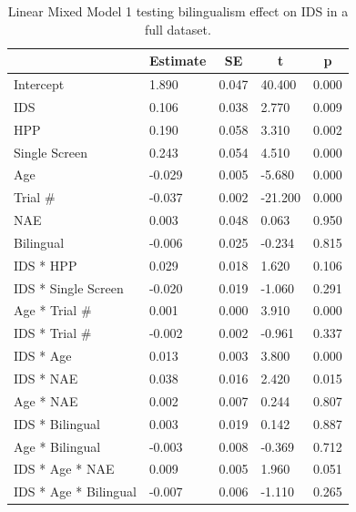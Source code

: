 \documentclass[,man,floatsintext]{apa6}
\begin{document}
\begin{table}[tbp]

\begin{center}
\begin{threeparttable}

\caption{\label{tab:unnamed-chunk-8}Linear Mixed Model 1 testing bilingualism effect on IDS in a full dataset.}

\begin{tabular}{lllll}
\toprule
 & \multicolumn{1}{c}{Estimate} & \multicolumn{1}{c}{SE} & \multicolumn{1}{c}{t} & \multicolumn{1}{c}{p}\\
\midrule
Intercept & 1.890 & 0.047 & 40.400 & 0.000\\
IDS & 0.106 & 0.038 & 2.770 & 0.009\\
HPP & 0.190 & 0.058 & 3.310 & 0.002\\
Single Screen & 0.243 & 0.054 & 4.510 & 0.000\\
Age & -0.029 & 0.005 & -5.680 & 0.000\\
Trial \# & -0.037 & 0.002 & -21.200 & 0.000\\
NAE & 0.003 & 0.048 & 0.063 & 0.950\\
Bilingual & -0.006 & 0.025 & -0.234 & 0.815\\
IDS * HPP & 0.029 & 0.018 & 1.620 & 0.106\\
IDS * Single Screen & -0.020 & 0.019 & -1.060 & 0.291\\
Age * Trial \# & 0.001 & 0.000 & 3.910 & 0.000\\
IDS * Trial \# & -0.002 & 0.002 & -0.961 & 0.337\\
IDS * Age & 0.013 & 0.003 & 3.800 & 0.000\\
IDS * NAE & 0.038 & 0.016 & 2.420 & 0.015\\
Age * NAE & 0.002 & 0.007 & 0.244 & 0.807\\
IDS * Bilingual & 0.003 & 0.019 & 0.142 & 0.887\\
Age * Bilingual & -0.003 & 0.008 & -0.369 & 0.712\\
IDS * Age * NAE & 0.009 & 0.005 & 1.960 & 0.051\\
IDS * Age * Bilingual & -0.007 & 0.006 & -1.110 & 0.265\\
\bottomrule
\end{tabular}

\end{threeparttable}
\end{center}

\end{table}
\end{document}

